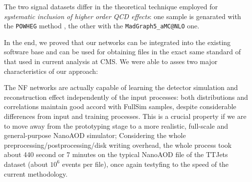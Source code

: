 The two signal datasets differ in the theoretical technique employed for \emph{systematic inclusion of higher order QCD effects}: one sample is genarated with the \texttt{POWHEG} method \cite{Nason_2004}, the other with the \texttt{MadGraph5\_aMC@NLO} \cite{powpow} one.

In the end, we proved that our networks can be integrated into the existing software base and can be used for obtaining files in the exact same standard of that used in current analysis at CMS. We were able to asses two major characteristics of our approach:

\begin{outline}
    \1 The NF networks are actually capable of learning the detector simulation and reconstruction effect independently of the input processes: both distributions and correlations maintain good accord with FullSim samples, despite considerable differences from input and training processes. This is a crucial property if we are to move away from the prototyping stage to a more realistic, full-scale and general-purpose NanoAOD simulator;
    \1 Considering the whole preprocessing/postprocessing/disk writing overhead, the whole process took about 440 second or 7 minutes on the typical NanoAOD file of the TTJets dataset (about $10^{6}$ events per file), once again testyfing to the speed of the current methodology.
\end{outline}